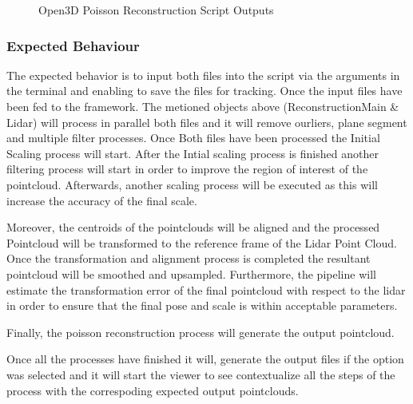 \documentclass[12pt]{report}
\begin{document}
\begin{figure}[H]
  \qquad
\caption{Open3D Poisson Reconstruction Script Outputs}
\label{fig:open3dpossionscreipt} 
\end{figure}
 

\subsubsection{Expected Behaviour}
The expected behavior is to input both files into the script via the arguments in the terminal and enabling to save the files for tracking. 
Once the input files have been fed to the framework. The metioned objects above (ReconstructionMain \& Lidar) will process in parallel both files and it will remove ourliers, plane segment and multiple filter processes.
Once Both files have been processed the Initial Scaling process will start. After the Intial scaling process is finished another filtering process will start in order to improve the region of interest of the pointcloud.
Afterwards, another scaling process will be executed as this will increase the accuracy of the final scale. 

Moreover, the centroids of the pointclouds will be aligned and the processed Pointcloud will be transformed to the reference frame of the Lidar Point Cloud.
Once the transformation and alignment process is completed the resultant pointcloud will be smoothed and upsampled.
Furthermore, the pipeline will estimate the transformation error of the final pointcloud with respect to the lidar in order to ensure that the final pose and scale is within acceptable parameters. 

Finally, the poisson reconstruction process will generate the output pointcloud. 

Once all the processes have finished it will, generate the output files if the option was selected and it will start the viewer to see contextualize all the steps of the process with the correspoding expected output pointclouds.
\end{document}
